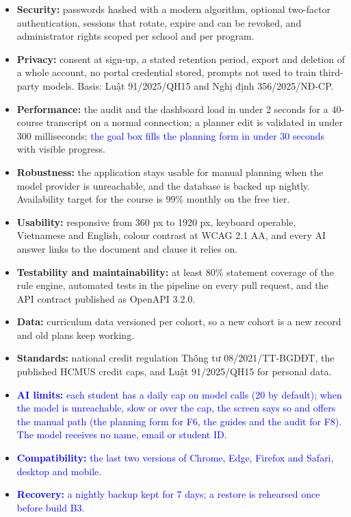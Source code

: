 \documentclass{article}
\begin{document}
\begin{itemize}
  \item \textbf{Security:} passwords hashed with a modern algorithm, optional two-factor authentication, sessions that
        rotate, expire and can be revoked, and administrator rights scoped per school and per program.
  \item \textbf{Privacy:} consent at sign-up, a stated retention period, export and deletion of a whole account, no portal
        credential stored, prompts not used to train third-party models. Basis: Luật 91/2025/QH15 and Nghị định
        356/2025/NĐ-CP.
  \item \textbf{Performance:} the audit and the dashboard load in under 2 seconds for a 40-course transcript on a normal
        connection; a planner edit is validated in under 300 milliseconds; \textcolor{blue}{the goal box fills the planning form in under
        30 seconds} with visible progress.
  \item \textbf{Robustness:} the application stays usable for manual planning when the model provider is unreachable, and
        the database is backed up nightly. Availability target for the course is 99\% monthly on the free tier.
  \item \textbf{Usability:} responsive from 360 px to 1920 px, keyboard operable, Vietnamese and English, colour contrast
        at WCAG 2.1 AA, and every AI answer links to the document and clause it relies on.
  \item \textbf{Testability and maintainability:} at least 80\% statement coverage of the rule engine, automated tests in
        the pipeline on every pull request, and the API contract published as OpenAPI 3.2.0.
  \item \textbf{Data:} curriculum data versioned per cohort, so a new cohort is a new record and old plans keep working.
  \item \textbf{Standards:} national credit regulation Thông tư 08/2021/TT-BGDĐT, the published HCMUS credit caps, and
        Luật 91/2025/QH15 for personal data.
  \item \textcolor{blue}{\textbf{AI limits:} each student has a daily cap on model calls (20 by default); when the model is
        unreachable, slow or over the cap, the screen says so and offers the manual path (the planning form for F6, the
        guides and the audit for F8). The model receives no name, email or student ID.}
  \item \textcolor{blue}{\textbf{Compatibility:} the last two versions of Chrome, Edge, Firefox and Safari, desktop and
        mobile.}
  \item \textcolor{blue}{\textbf{Recovery:} a nightly backup kept for 7 days; a restore is rehearsed once before build
        B3.}
\end{itemize}
\end{document}

